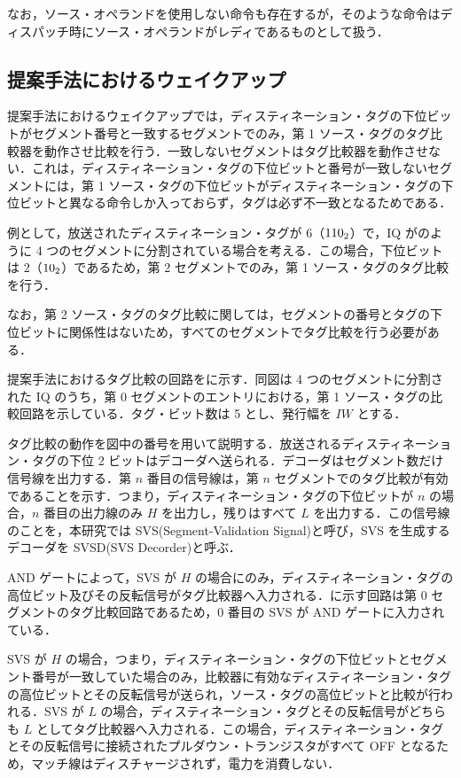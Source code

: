 なお，ソース・オペランドを使用しない命令も存在するが，そのような命令はディスパッチ時にソース・オペランドがレディであるものとして扱う．


\subsection{提案手法におけるウェイクアップ}
提案手法におけるウェイクアップでは，ディスティネーション・タグの下位ビットがセグメント番号と一致するセグメントでのみ，第 1 ソース・タグのタグ比較器を動作させ比較を行う．一致しないセグメントはタグ比較器を動作させない．これは，ディスティネーション・タグの下位ビットと番号が一致しないセグメントには，第 1 ソース・タグの下位ビットがディスティネーション・タグの下位ビットと異なる命令しか入っておらず，タグは必ず不一致となるためである．

例として，放送されたディスティネーション・タグが 6（${\rm 110_2}$）で，IQ がのように 4 つのセグメントに分割されている場合を考える．この場合，下位ビットは 2（${\rm 10_2}$）であるため，第 2 セグメントでのみ，第 1 ソース・タグのタグ比較を行う．

なお，第 2 ソース・タグのタグ比較に関しては，セグメントの番号とタグの下位ビットに関係性はないため，すべてのセグメントでタグ比較を行う必要がある．

提案手法におけるタグ比較の回路をに示す．同図は 4 つのセグメントに分割された IQ のうち，第 0 セグメントのエントリにおける，第 1 ソース・タグの比較回路を示している．タグ・ビット数は 5 とし、発行幅を $IW$ とする．

タグ比較の動作を図中の番号を用いて説明する．放送されるディスティネーション・タグの下位 2 ビットはデコーダへ送られる．デコーダはセグメント数だけ信号線を出力する．第 $n$ 番目の信号線は，第 $n$ セグメントでのタグ比較が有効であることを示す．つまり，ディスティネーション・タグの下位ビットが $n$ の場合，$n$ 番目の出力線のみ $H$ を出力し，残りはすべて $L$ を出力する．この信号線のことを，本研究では SVS(Segment-Validation Signal)と呼び，SVS を生成するデコーダを SVSD(SVS Decorder)と呼ぶ．

AND ゲートによって，SVS が $H$ の場合にのみ，ディスティネーション・タグの高位ビット及びその反転信号がタグ比較器へ入力される．に示す回路は第 0 セグメントのタグ比較回路であるため，0 番目の SVS が AND ゲートに入力されている．

SVS が $H$ の場合，つまり，ディスティネーション・タグの下位ビットとセグメント番号が一致していた場合のみ，比較器に有効なディスティネーション・タグの高位ビットとその反転信号が送られ，ソース・タグの高位ビットと比較が行われる．SVS が $L$ の場合，ディスティネーション・タグとその反転信号がどちらも $L$ としてタグ比較器へ入力される．この場合，ディスティネーション・タグとその反転信号に接続されたプルダウン・トランジスタがすべて OFF となるため，マッチ線はディスチャージされず，電力を消費しない．

